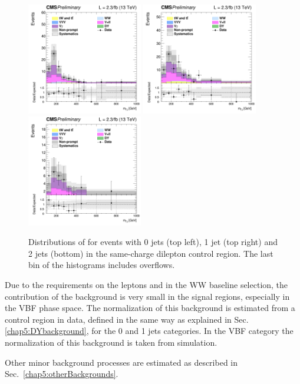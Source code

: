 \begin{figure}[htb]
\centering
\includegraphics[width=0.45\textwidth]{images/13TeV/HighMass/cratio_hww2l2v_13TeV_ss_of0j_mTi_0j.png}
\includegraphics[width=0.45\textwidth]{images/13TeV/HighMass/cratio_hww2l2v_13TeV_ss_of1j_mTi_1j.png}
\includegraphics[width=0.45\textwidth]{images/13TeV/HighMass/cratio_hww2l2v_13TeV_ss_of2j_mTi_VBF.png}
\caption{
Distributions of \mti for events with 0 jets (top left), 1 jet (top right) and 2 jets (bottom) in the same-charge dilepton
control region. The last bin of the histograms includes overflows. %
}
\label{fig:13TeV_hm_samesign}
\end{figure}

Due to the requirements on the leptons \pt and \mll in the WW baseline selection, the contribution of the \dytt background is very small in the signal regions, especially in the VBF phase space. The normalization of this background is estimated from a control region in data, defined in the same way as explained in Sec.\ref{chap5:DYbackground}, for the 0 and 1 jets categories. In the VBF category the normalization of this background is taken from simulation.

Other minor background processes are estimated as described in Sec.~\ref{chap5:otherBackgrounds}.













